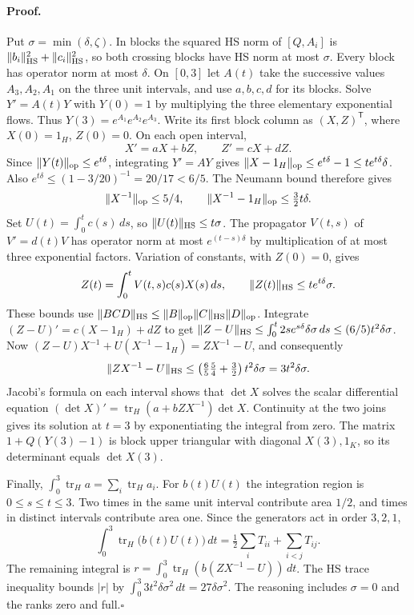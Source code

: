 \documentclass[11pt,letterpaper]{article}
\begin{document}
\paragraph{Proof.}
Put $\sigma=\min(\delta,\zeta)$. In blocks the squared HS norm of $[Q,A_i]$ is $\|b_i\|_{\rm HS}^2+\|c_i\|_{\rm HS}^2$, so both crossing blocks have HS norm at most $\sigma$. Every block has operator norm at most $\delta$.
On $[0,3]$ let $A(t)$ take the successive values $A_3,A_2,A_1$ on the three unit intervals, and use $a,b,c,d$ for its blocks. Solve $Y'=A(t)Y$ with $Y(0)=1$ by multiplying the three elementary exponential flows. Thus $Y(3)=e^{A_1}e^{A_2}e^{A_3}$. Write its first block column as $(X,Z)^{\mathsf T}$, where $X(0)=1_H$, $Z(0)=0$. On each open interval,
\[
 X'=aX+bZ,\qquad Z'=cX+dZ.
\]
Since $\|Y(t)\|_{\rm op}\le e^{t\delta}$, integrating $Y'=AY$ gives $\|X-1_H\|_{\rm op}\le e^{t\delta}-1\le te^{t\delta}\delta$. Also
$e^{t\delta}\le (1-3/20)^{-1}=20/17<6/5$.
The Neumann bound therefore gives
\[
 \|X^{-1}\|_{\rm op}\le 5/4,\qquad
 \|X^{-1}-1_H\|_{\rm op}\le\tfrac32 t\delta .
\]
Set $U(t)=\int_0^t c(s)\,ds$, so $\|U(t)\|_{\rm HS}\le t\sigma$.
The propagator $V(t,s)$ of $V'=d(t)V$ has operator norm at most $e^{(t-s)\delta}$ by multiplication of at most three exponential factors. Variation of constants, with $Z(0)=0$, gives
\[
 Z(t)=\int_0^t V(t,s)c(s)X(s)\,ds,\qquad
 \|Z(t)\|_{\rm HS}\le t e^{t\delta}\sigma .
\]
These bounds use $\|BCD\|_{\rm HS}\le\|B\|_{\rm op}\|C\|_{\rm HS}\|D\|_{\rm op}$. Integrate
$(Z-U)'=c(X-1_H)+dZ$ to get
$\|Z-U\|_{\rm HS}\le\int_0^t 2s e^{s\delta}\delta\sigma\,ds\le (6/5)t^2\delta\sigma$.
Now $(Z-U)X^{-1}+U(X^{-1}-1_H)=ZX^{-1}-U$, and consequently
\[
 \|ZX^{-1}-U\|_{\rm HS}\le
 \left(\tfrac65\tfrac54+\tfrac32\right)t^2\delta\sigma
 =3t^2\delta\sigma.
\]
Jacobi's formula on each interval shows that $\det X$ solves the scalar differential equation
$(\det X)'=\operatorname{tr}_H(a+bZX^{-1})\det X$. Continuity at the two joins gives its solution at $t=3$ by exponentiating the integral from zero. The matrix $1+Q(Y(3)-1)$ is block upper triangular with diagonal $X(3),1_K$, so its determinant equals $\det X(3)$.

Finally, $\int_0^3\operatorname{tr}_H a=\sum_i\operatorname{tr}_H a_i$.
For $b(t)U(t)$ the integration region is $0\le s\le t\le3$. Two times in the same unit interval contribute area $1/2$, and times in distinct intervals contribute area one. Since the generators act in order $3,2,1$,
\[
 \int_0^3\operatorname{tr}_H\bigl(b(t)U(t)\bigr)\,dt
 =\tfrac12\sum_i T_{ii}+\sum_{i<j}T_{ij}.
\]
The remaining integral is $r=\int_0^3\operatorname{tr}_H(b(ZX^{-1}-U))\,dt$.
The HS trace inequality bounds $|r|$ by $\int_0^3 3t^2\delta\sigma^2\,dt=27\delta\sigma^2$. The reasoning includes $\sigma=0$ and the ranks zero and full.\hfill$\square$
\end{document}
